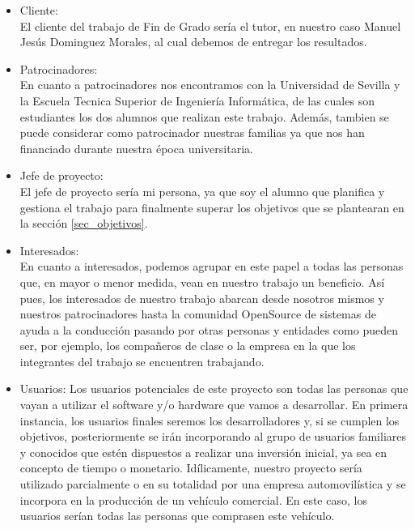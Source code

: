 \begin{itemize}
    \item Cliente:\\
    El cliente del trabajo de Fin de Grado sería el tutor, en nuestro caso Manuel Jesús Dominguez Morales, al cual debemos de entregar los resultados.

    \item Patrocinadores:\\
    En cuanto a patrocinadores nos encontramos con la Universidad de Sevilla y la Escuela Tecnica Superior de Ingeniería Informática, de las cuales son estudiantes los dos alumnos que realizan este trabajo. Además, tambien se puede considerar como patrocinador nuestras familias ya que nos han financiado durante nuestra época universitaria.

    \item Jefe de proyecto:\\
    El jefe de proyecto sería mi persona, ya que soy el alumno que planifica y gestiona el trabajo para finalmente superar los objetivos que se plantearan en la sección \ref{sec_objetivos}.

    \item Interesados:\\
    En cuanto a interesados, podemos agrupar en este papel a todas las personas que, en mayor o menor medida, vean en nuestro trabajo un beneficio. Así pues, los interesados de nuestro trabajo abarcan desde nosotros mismos y nuestros patrocinadores hasta la comunidad OpenSource de sistemas de ayuda a la conducción pasando por otras personas y entidades como pueden ser, por ejemplo, los compañeros de clase o la empresa en la que los integrantes del trabajo se encuentren trabajando.

    \item Usuarios:
    Los usuarios potenciales de este proyecto son todas las personas que vayan a utilizar el software y/o hardware que vamos a desarrollar.
    En primera instancia, los usuarios finales seremos los desarrolladores y, si se cumplen los objetivos, posteriormente se irán incorporando al grupo de usuarios familiares y conocidos que estén dispuestos a realizar una inversión inicial, ya sea en concepto de tiempo o monetario.
    Idílicamente, nuestro proyecto sería utilizado parcialmente o en su totalidad por una empresa automovilística y se incorpora en la producción de un vehículo comercial. En este caso, los usuarios serían todas las personas que comprasen este vehículo.

\end{itemize}


